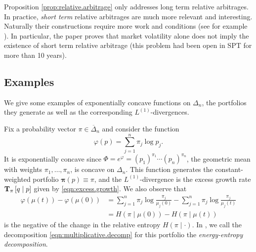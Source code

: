 \documentclass[graybox]{svmult}
\begin{document}
Proposition \ref{prop:relative.arbitrage} only addresses long term relative arbitrages. In practice, {\it short term} relative arbitrages are much more relevant and interesting. Naturally their constructions require more work and conditions  (see  for example \cite{FKK05, BF08, FK:10, P16}). In particular, the paper \cite{FKR17} proves that market volatility alone does not imply the existence of short term relative arbitrage (this problem had been open in SPT for more than 10 years).

\subsection{Examples}
We give some examples of exponentially concave functions on $\Delta_n$, the portfolios they generate as well as the corresponding $L^{(1)}$-divergences.

\begin{example}
Fix a probability vector $\pi \in \overline{\Delta}_n$ and consider the function 
\[
\varphi(p) = \sum_{j = 1}^n \pi_j \log p_j.
\]
It is exponentially concave since $\Phi = e^{\varphi} = \left(p_1\right)^{\pi_1} \cdots \left(p_n\right)^{\pi_n}$, the geometric mean with weights $\pi_1, \ldots, \pi_n$, is concave on $\Delta_n$. This function generates the constant-weighted portfolio $\boldsymbol{\pi}(p) \equiv \pi$, and the $L^{(1)}$-divergence is the excess growth rate ${\bf T}_{\pi}\left[q \mid p\right]$ given by \eqref{eqn:excess.growth}. We also observe that
\begin{equation*}
\begin{split}
\varphi(\mu(t)) - \varphi(\mu(0)) &= \sum_{j = 1}^n \pi_j \log \frac{\pi_j}{\mu_j(0)} - \sum_{j = 1}^n \pi_j \log \frac{\pi_j}{\mu_j(t)} \\
  &= H\left( \pi \mid \mu(0)\right) - H\left( \pi \mid \mu(t)\right)
\end{split}
\end{equation*}
is the negative of the change in the relative entropy $H\left( \pi \mid \cdot\right)$. In \cite{PW13}, we call the decomposition \eqref{eqn:multiplicative.decomp} for this portfolio the {\it energy-entropy decomposition}.
\end{example}
\end{document}
